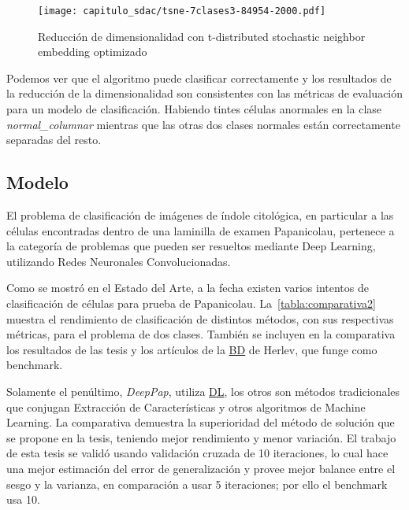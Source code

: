 \begin{figure}[H]
    \centering
    \texttt{[image: capitulo\_sdac/tsne-7clases3-84954-2000.pdf]}
    \caption{Reducción de dimensionalidad con t-distributed stochastic neighbor embedding optimizado}\label{fig:tsne}
\end{figure}

Podemos ver que el algoritmo puede clasificar correctamente y los resultados de
la reducción de la dimensionalidad son consistentes con las métricas de
evaluación para un modelo de clasificación. Habiendo tintes células anormales en
la clase \emph{normal\_columnar} mientras que las otras dos clases normales
están correctamente separadas del resto.

\subsection{Modelo}

El problema de clasificación de imágenes de índole citológica, en particular a
las células encontradas dentro de una laminilla de examen Papanicolau, pertenece
a la categoría de problemas que pueden ser resueltos mediante Deep Learning,
utilizando Redes Neuronales Convolucionadas.

Como se mostró en el Estado del Arte, a la fecha existen varios intentos de
clasificación de células para prueba de Papanicolau.
La~\autoref{tabla:comparativa2} muestra el rendimiento de clasificación de
distintos métodos, con sus respectivas métricas, para el problema de dos clases.
También se incluyen en la comparativa los resultados de las tesis y los
artículos de la \hyperlink{abbr}{BD} de Herlev, que funge como benchmark.

Solamente el penúltimo, \emph{DeepPap}, utiliza \hyperlink{abbr}{DL}, los otros
son métodos tradicionales que conjugan Extracción de Características y otros
algoritmos de Machine Learning. La comparativa demuestra la superioridad del
método de solución que se propone en la tesis, teniendo mejor rendimiento y
menor variación. El trabajo de esta tesis se validó usando validación cruzada de
10 iteraciones, lo cual hace una mejor estimación del error de generalización y
provee mejor balance entre el sesgo y la varianza, en comparación a usar 5
iteraciones; por ello el benchmark usa 10.

